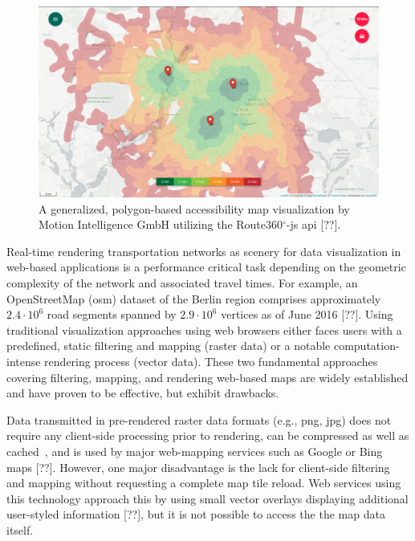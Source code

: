     \begin{figure}[htb]
      \centering
      \includegraphics[width=\linewidth]
        {./img/screenshot-r360js-demo.png}
      \caption{A generalized, polygon-based accessibility map visualization
        by Motion Intelligence GmbH utilizing the Route360$^\circ$-\acrshort{js}
        \acrshort{api} [??].}
      \label{fig:intro:r360d}
    \end{figure}

    Real-time rendering transportation networks as scenery for data
    visualization in web-based applications is a performance critical task
    depending on the geometric complexity of the network and associated travel
    times. For example, an OpenStreetMap (\acrshort{osm}) dataset of the Berlin
    region comprises approximately $2.4 \cdot 10^6$ road segments spanned by
    $2.9 \cdot 10^6$ vertices as of June 2016 [??]. Using traditional visualization
    approaches using web browsers either faces users with a predefined, static
    filtering and mapping (raster data) or a notable computation-intense
    rendering process (vector data). These two fundamental approaches covering
    filtering, mapping, and rendering web-based maps are widely established and
    have proven to be effective, but exhibit drawbacks.\par

    Data transmitted in pre-rendered raster data formats (e.g., \acrshort{png},
    \acrshort{jpg}) does
    not require any client-side processing prior to rendering, can be compressed
    as well as cached~\cite{ESRI2006}, and is used by major web-mapping services
    such as Google or Bing maps [??]. However, one major disadvantage is the
    lack for client-side filtering and mapping without requesting a complete map
    tile reload. Web services using this technology approach this by using small
    vector overlays displaying additional user-styled information [??], but it
    is not possible to access the the map data itself.\par

